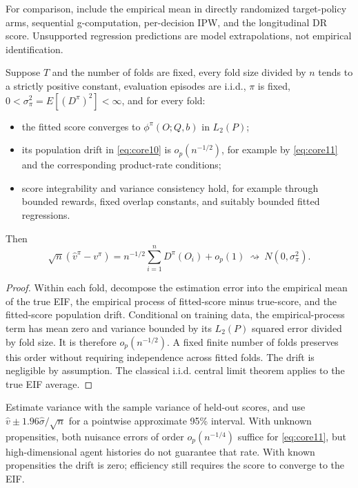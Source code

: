 For comparison, include the empirical mean in directly randomized target-policy arms, sequential g-computation, per-decision IPW, and the longitudinal DR score. Unsupported regression predictions are model extrapolations, not empirical identification.

\begin{theorem}\label{core-result-4}
Suppose \(T\) and the number of folds are fixed, every fold size divided by \(n\) tends to a strictly positive constant, evaluation episodes are i.i.d., \(\pi\) is fixed, \(0<\sigma_\pi^2=E[(D^{\pi})^2]<\infty\), and for every fold:

\begin{itemize}
\tightlist
\item
  the fitted score converges to \(\phi^{\pi}(O;Q,b)\) in \(L_2(P)\);
\item
  its population drift in \eqref{eq:core10} is \(o_p(n^{-1/2})\), for example by \eqref{eq:core11} and the corresponding product-rate conditions;
\item
  score integrability and variance consistency hold, for example through bounded rewards, fixed overlap constants, and suitably bounded fitted regressions.
\end{itemize}

Then
\begin{equation}\label{eq:core12}
\sqrt n(\widehat v^{\pi}-v^{\pi})
=n^{-1/2}\sum_{i=1}^{n}D^{\pi}(O_i)+o_p(1)
\ \rightsquigarrow\ N(0,\sigma_\pi^2).
\end{equation}
\end{theorem}
\begin{proof}
Within each fold, decompose the estimation error into the empirical mean of the true EIF, the empirical process of fitted-score minus true-score, and the fitted-score population drift. Conditional on training data, the empirical-process term has mean zero and variance bounded by its \(L_2(P)\) squared error divided by fold size. It is therefore \(o_p(n^{-1/2})\). A fixed finite number of folds preserves this order without requiring independence across fitted folds. The drift is negligible by assumption. The classical i.i.d. central limit theorem applies to the true EIF average.
\end{proof}

Estimate variance with the sample variance of held-out scores, and use \(\widehat v\pm1.96\widehat\sigma/\sqrt n\) for a pointwise approximate 95\% interval. With unknown propensities, both nuisance errors of order \(o_p(n^{-1/4})\) suffice for \eqref{eq:core11}, but high-dimensional agent histories do not guarantee that rate. With known propensities the drift is zero; efficiency still requires the score to converge to the EIF.

